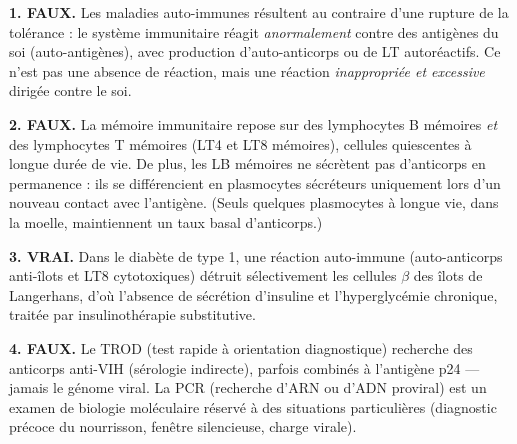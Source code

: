 \documentclass[11pt]{article}
\newcommand{\cle}[1]{{\popxbold\color{popdark}#1}}
\begin{document}
\begin{corrige}
\textbf{1. FAUX.} Les maladies auto-immunes résultent au contraire d'une \cle{rupture de la tolérance} : le système immunitaire réagit \emph{anormalement} contre des antigènes du soi (auto-antigènes), avec production d'auto-anticorps ou de LT autoréactifs. Ce n'est pas une absence de réaction, mais une réaction \emph{inappropriée et excessive} dirigée contre le soi.

\textbf{2. FAUX.} La mémoire immunitaire repose sur des \cle{lymphocytes B mémoires} \emph{et} des \cle{lymphocytes T mémoires} (LT4 et LT8 mémoires), cellules quiescentes à longue durée de vie. De plus, les LB mémoires ne sécrètent pas d'anticorps en permanence : ils se différencient en plasmocytes sécréteurs uniquement lors d'un nouveau contact avec l'antigène. (Seuls quelques plasmocytes à longue vie, dans la moelle, maintiennent un taux basal d'anticorps.)

\textbf{3. VRAI.} Dans le \cle{diabète de type 1}, une réaction auto-immune (auto-anticorps anti-îlots et LT8 cytotoxiques) détruit sélectivement les cellules $\beta$ des îlots de Langerhans, d'où l'absence de sécrétion d'insuline et l'hyperglycémie chronique, traitée par insulinothérapie substitutive.

\textbf{4. FAUX.} Le TROD (test rapide à orientation diagnostique) recherche des \cle{anticorps anti-VIH} (sérologie indirecte), parfois combinés à l'antigène p24 — jamais le génome viral. La PCR (recherche d'ARN ou d'ADN proviral) est un examen de biologie moléculaire réservé à des situations particulières (diagnostic précoce du nourrisson, fenêtre silencieuse, charge virale).
\end{corrige}
\end{document}
